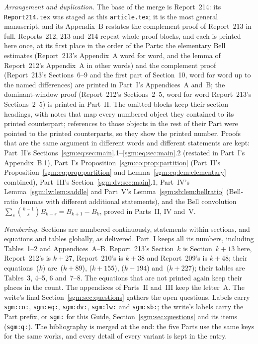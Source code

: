 \documentclass[11pt,letterpaper]{article}
\theoremstyle{remark}\newtheorem{remark}[theorem]{Remark}
\newcommand{\file}[1]{\nolinkurl{#1}}
\theoremstyle{definition}\newtheorem{definition}[theorem]{Definition}
\begin{document}
\emph{Arrangement and duplication.} The base of the merge is Report~214:
its \file{Report214.tex} was staged as this \file{article.tex}; it is the
most general manuscript, and its Appendix~B restates the complement proof of
Report~213 in full. Reports~212, 213 and~214 repeat whole proof blocks, and
each is printed here once, at its first place in the order of the Parts:
the elementary Bell estimates (Report~213's Appendix~A word for word, and the
lemma of Report~212's Appendix~A in other words) and the complement proof
(Report~213's Sections~6--9 and the first part of Section~10, word for word
up to the named differences) are printed in Part~I's Appendices~A and~B; the
dominant-window proof (Report~212's Sections~2--5, word for word Report~213's
Sections~2--5) is printed in Part~II. The omitted blocks keep their section
headings, with notes that map every numbered object they contained to its
printed counterpart; references to those objects in the rest of their Part
were pointed to the printed counterparts, so they show the printed number.
Proofs that are the same argument in different words and different
statements are kept: Part~II's Sections~\ref{sgm:eq:sec:main}.1--\ref{sgm:eq:sec:main}.2
(restated in Part~I's Appendix~B.1), Part~I's Proposition~\ref{sgm:co:prop:partition}
(Part~II's Proposition~\ref{sgm:eq:prop:partition} and
Lemma~\ref{sgm:eq:lem:elementary} combined), Part~III's
Section~\ref{sgm:dv:sec:main}.1, Part~IV's Lemma~\ref{sgm:lw:lem:saddle} and
Part~V's Lemma~\ref{sgm:sb:lem:bellratio} (Bell-ratio lemmas with different
additional statements), and the Bell convolution
$\sum_s\binom{k-1}sB_{k-s}=B_{k+1}-B_k$, proved in Parts~II, IV and~V.

\emph{Numbering.} Sections are numbered continuously, statements within
sections, and equations and tables globally, as delivered. Part~I keeps all
its numbers, including Tables~1--2 and Appendices~A--B. Report~213's
Section~$k$ is Section~$k+13$ here, Report~212's is $k+27$, Report~210's is
$k+38$ and Report~209's is $k+48$; their equations~($k$) are~($k+89$),
($k+155$), ($k+194$) and~($k+227$); their tables are Tables~3, 4--5, 6
and~7--8. The equations that are not printed again keep their places in the
count. The appendices of Parts~II and~III keep the letter~A. The write's
final Section~\ref{sgm:sec:questions} gathers the open questions. Labels
carry \file{sgm:co:}, \file{sgm:eq:}, \file{sgm:dv:}, \file{sgm:lw:} and
\file{sgm:sb:}; the write's labels carry the Part prefix, or \file{sgm:} for
this Guide, Section~\ref{sgm:sec:questions} and its items (\file{sgm:q:}).
The bibliography is merged at the end: the five Parts use the same keys for
the same works, and every detail of every variant is kept in the entry.
\end{document}
